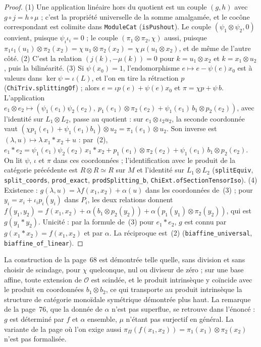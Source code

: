 \begin{proof}
(1) Une application linéaire hors du quotient est un couple $(g, h)$ avec $g \circ j = h \circ \mu$ ; c'est la propriété universelle de la somme amalgamée, et le cocône correspondant est colimite dans \texttt{ModuleCat} (\texttt{isPushout}). Le couple $(\psi_1 \otimes \psi_2, 0)$ convient, puisque $\psi_i\iota_i = 0$ ; le couple $(\pi_1 \otimes \pi_2, \chi)$ aussi, puisque $\pi_1\iota_1(u_1) \otimes \pi_2(x_2) = \chi\,u_1 \otimes \pi_2(x_2) = \chi\,\mu(u_1 \otimes x_2)$, et de même de l'autre côté. (2) C'est la relation $(j(k), -\mu(k)) = 0$ pour $k = u_1 \otimes x_2$ et $k = x_1 \otimes u_2$, puis la bilinéarité. (3) Si $\psi(x_0) = 1$, l'endomorphisme $e \mapsto e - \psi(e)x_0$ est à valeurs dans $\ker\psi = \iota(L)$, et l'on en tire la rétraction $p$ (\texttt{ChiTriv.\allowbreak{}splittingOf}) ; alors $e = \iota p(e) + \psi(e)x_0$ et $\pi = \chi p + \psi\, b$. L'application $e_1 \otimes e_2 \mapsto (\psi_1(e_1)\psi_2(e_2),\ p_1(e_1) \otimes \pi_2(e_2) + \psi_1(e_1)\, b_1 \otimes p_2(e_2))$, avec l'identité sur $L_1 \otimes L_2$, passe au quotient : sur $e_1 \otimes \iota_2 u_2$, la seconde coordonnée vaut $(\chi p_1(e_1) + \psi_1(e_1) b_1) \otimes u_2 = \pi_1(e_1) \otimes u_2$. Son inverse est $(\lambda, u) \mapsto \lambda\,x_1 * x_2 + u$ : par~(2), $e_1 * e_2 = \psi_1(e_1)\psi_2(e_2)\,x_1 * x_2 + p_1(e_1) \otimes \pi_2(e_2) + \psi_1(e_1)\, b_1 \otimes p_2(e_2)$. On lit $\psi$, $\iota$ et $\pi$ dans ces coordonnées ; l'identification avec le produit de la catégorie précédente est $R \otimes R \simeq R$ sur $M$ et l'identité sur $L_1 \otimes L_2$ (\texttt{splitEquiv}, \texttt{split\_coords}, \texttt{prod\_exact}, \texttt{prodSplitting\_b}, \texttt{ChiExt.\allowbreak{}ofSectionTensorIso}). (4) Existence : $g(\lambda, u) = \lambda f(x_1, x_2) + \alpha(u)$ dans les coordonnées de~(3) ; pour $y_i = x_i + \iota_i p_i(y_i)$ dans $P_i$, les deux relations donnent $f(y_1, y_2) = f(x_1, x_2) + \alpha(b_1 \otimes p_2(y_2)) + \alpha(p_1(y_1) \otimes \pi_2(y_2))$, qui est $g(y_1 * y_2)$. Unicité : par la formule de~(3) pour $e_1 * e_2$, $g$ est connu par $g(x_1 * x_2) = f(x_1, x_2)$ et par $\alpha$. La réciproque est~(2) (\texttt{biaffine\_universal}, \texttt{biaffine\_of\_linear}).
\end{proof}

\begin{remarque}
La construction de la page~68 est démontrée telle quelle, sans division et sans choisir de scindage, pour $\chi$ quelconque, nul ou diviseur de zéro ; sur une base affine, toute extension de $\mathcal O$ est scindée, et le produit intrinsèque y coïncide avec le produit en coordonnées $b_1 \otimes b_2$, ce qui transporte au produit intrinsèque la structure de catégorie monoïdale symétrique démontrée plus haut. La remarque de la page~76, que la donnée de $\alpha$ n'est pas superflue, se retrouve dans l'énoncé : $g$ est déterminé par $f$ et $\alpha$ ensemble, $\mu$ n'étant pas surjectif en général. La variante de la page où l'on exige aussi $\pi_\Pi(f(x_1, x_2)) = \pi_1(x_1) \otimes \pi_2(x_2)$ n'est pas formalisée.
\end{remarque}

